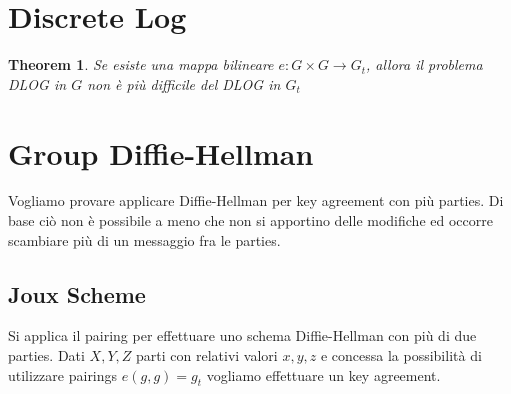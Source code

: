 \documentclass{book}
\newtheorem{theorem}{Theorem}[section]
\begin{document}
\section{Discrete Log}
\begin{theorem}
	Se esiste una mappa bilineare \(e:G\times G\rightarrow G_{t}\), allora il problema DLOG in \(G\) non è più difficile del DLOG in \(G_{t}\)
\end{theorem}
\section{Group Diffie-Hellman}
Vogliamo provare applicare Diffie-Hellman per key agreement con più parties. Di base ciò non è possibile a meno che non si apportino delle modifiche ed occorre scambiare più di un messaggio fra le parties.
\subsection{Joux Scheme}
Si applica il pairing per effettuare uno schema Diffie-Hellman con più di due parties\@.\newline
Dati \(X,Y,Z\) parti con relativi valori \(x,y,z\) e concessa la possibilità di utilizzare pairings \(e(g,g)=g_{t}\) vogliamo effettuare un key agreement.\newline
\end{document}
